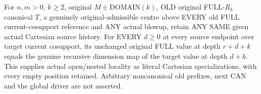 \begin{theorem}
\label{hir:original-prepared-joint-source-bound-full-values}
\leanok
For $n,m>0$, $k\geq2$, original $M\in\mathrm{DOMAIN}(k)$,
OLD original FULL-$R_k$ canonical $T$, a genuinely original-admissible
centre above EVERY old FULL current-cosupport reference and ANY
actual blowup, retain ANY SAME given actual Cartesian source history.
For EVERY $d\geq0$ at every source endpoint over target current
cosupport, its unchanged original FULL value at depth $r+d+k$ equals
the genuine recursive dimension map of the target value at depth
$d+k$. This supplies actual open/nested locality as literal Cartesian
specializations, with every empty position retained. Arbitrary
noncanonical old prefixes, next CAN and the global driver are not
asserted.
\end{theorem}
